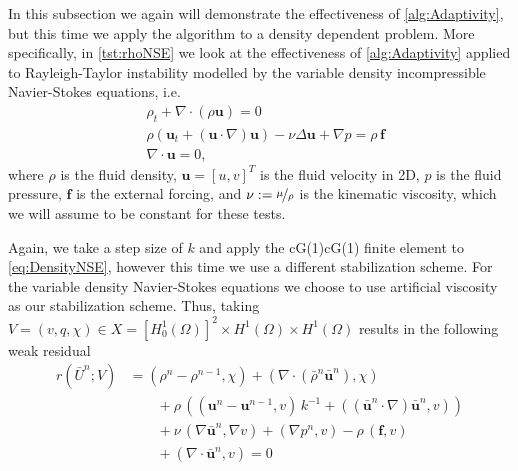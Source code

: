 In this subsection we again will demonstrate the effectiveness of
\autoref{alg:Adaptivity}, but this time we apply the algorithm to a density
dependent problem. More specifically, in \autoref{tst:rhoNSE} we look at the
effectiveness of \autoref{alg:Adaptivity} applied to Rayleigh-Taylor instability
modelled by the variable density incompressible Navier-Stokes equations, i.e.
\begin{equation}
    \begin{split}
        &\rho_t + \nabla \cdot \left( \rho \mathbf{u} \right) = 0 \\
        &\rho \left( \mathbf{u}_t
            + \left( \mathbf{u}\cdot \nabla \right) \mathbf{u} \right)
            - \nu \Delta \mathbf{u} + \nabla p = \rho\, \mathbf{f} \\
        &\nabla \cdot \mathbf{u} = 0,
    \end{split}
    \label{eq:DensityNSE}
\end{equation}
where $\rho$ is the fluid density, $\mathbf{u} = \left[ u, v \right]^T$ is the
fluid velocity in 2D, $p$ is the fluid pressure, $\mathbf{f}$ is the
external forcing, and $\nu := \nicefrac{\mu}{\rho}$ is the kinematic viscosity,
which we will assume to be constant for these tests.

Again, we take a step size of $k$ and apply the cG(1)cG(1) finite
element to \autoref{eq:DensityNSE}, however this time we use a different
stabilization scheme. For the variable density Navier-Stokes equations we
choose to use artificial viscosity as our stabilization scheme. Thus, taking
$V = (v, q, \chi) \in X = \left[ H^1_0(\Omega) \right]^2 \times H^1(\Omega)
\times H^1(\Omega)$ results in the following weak residual
\begin{equation}
    \begin{split}
        r(\bar{U}^n; V) &= (\rho^n - \rho^{n-1}, \chi)
            + (\nabla \cdot \left( \bar{\rho}^n \bar{\mathbf{u}}^n \right), \chi) \\
        &\qquad+  \rho\, \left(\left(\mathbf{u}^n
                - \mathbf{u}^{n-1}, v\right)\,k^{-1}
            + (\left( \bar{\mathbf{u}}^n \cdot \nabla \right)
                \bar{\mathbf{u}}^n, v)\right) \\
        &\qquad+ \nu\, (\nabla \bar{\mathbf{u}}^n, \nabla v)
            + (\nabla p^n, v) - \rho\, (\mathbf{f}, v) \\
        &\qquad+ (\nabla \cdot \bar{\mathbf{u}}^n, v) = 0
    \end{split}
    \label{eq:WeakRhoNSE}
\end{equation}

